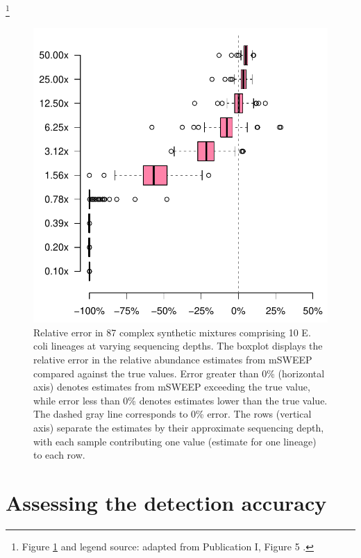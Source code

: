 \documentclass[officiallayout]{tktla}
\let\svthefootnote\thefootnote
\begin{document}
\noindent\let\thefootnote\relax\footnote{Figure \ref{fig:msweep-sequencing-depth} and legend source: adapted from Publication I, Figure 5 \citep{maklin_high-resolution_2021}.}
\addtocounter{footnote}{-1}\let\thefootnote\svthefootnote
\begin{figure}[!t]
  \centering
  \includegraphics[height=0.75\textheight,width=\textwidth,keepaspectratio]{img/reproduced/WOR2021_mSWEEP_Figure_5.pdf}
  \caption{Relative error in 87 complex synthetic mixtures comprising
    10 E. coli lineages at varying sequencing depths.  The boxplot
    displays the relative error in the relative abundance estimates
    from mSWEEP compared against the true values. Error greater than
    0\% (horizontal axis) denotes estimates from mSWEEP exceeding the
    true value, while error less than 0\% denotes estimates lower than
    the true value. The dashed gray line corresponds to 0\% error. The
    rows (vertical axis) separate the estimates by their approximate
    sequencing depth, with each sample contributing one value
    (estimate for one lineage) to each row.}
    \label{fig:msweep-sequencing-depth}
\end{figure}


\section{Assessing the detection accuracy}
\end{document}
